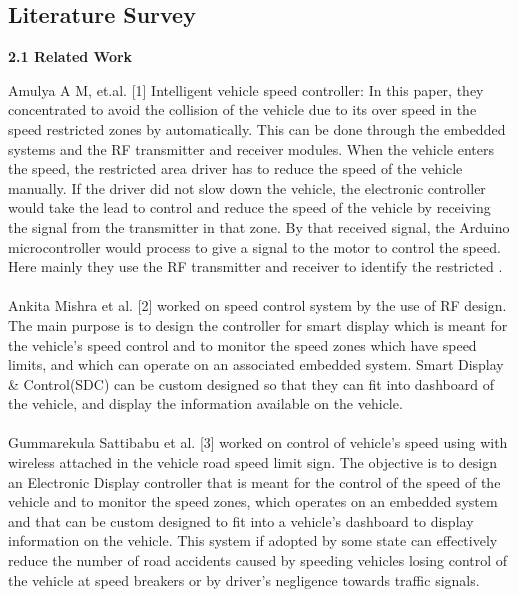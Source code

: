 \documentclass[a4paper,12pt, English]{article}
\begin{document}
\begin{normalsize}
 

\newpage
\begin{center}
\section{ \Large Literature Survey}
\end{center}
\newline
\begin{large}
\textbf{2.1 Related Work}
\end{large}
\newline

 Amulya A M, et.al. [1] Intelligent vehicle speed controller: In this paper, they concentrated to avoid the collision of the vehicle due to its over speed in the speed restricted zones by automatically. This can be done through the embedded systems and the RF transmitter and receiver modules. When the vehicle enters the speed, the restricted area driver has to reduce the speed of the vehicle manually. If the driver did not slow down the vehicle, the electronic controller would take the lead to control and reduce the speed of the vehicle by receiving the signal from the transmitter in that zone. By that received signal, the Arduino microcontroller would process to give a signal to the motor to control the speed. Here mainly they use the RF transmitter and receiver to identify the restricted .\\
 \\
 Ankita Mishra et al. [2] worked on speed control system by the use of RF design. The main purpose
is to design the controller for smart display which is meant for the vehicle’s speed control and to monitor the
speed zones which have speed limits, and which can operate on an associated embedded system. Smart Display & Control(SDC) can be custom designed so that they can fit into dashboard of the vehicle, and display the information available on the vehicle.\\
 \\
 Gummarekula Sattibabu et al. [3] worked on control of vehicle’s speed using with wireless attached in the vehicle road
speed limit sign. The objective is to design an Electronic Display controller that is meant for the control of the speed of the vehicle and to monitor the speed zones, which operates on an embedded system and that can be custom designed to fit into a
vehicle’s dashboard to display
information on the vehicle. This system if adopted by some state can effectively reduce the
number of road accidents caused by speeding vehicles losing control of the vehicle at speed breakers or by driver’s negligence towards traffic signals.\\

\end{normalsize}
\end{document}
